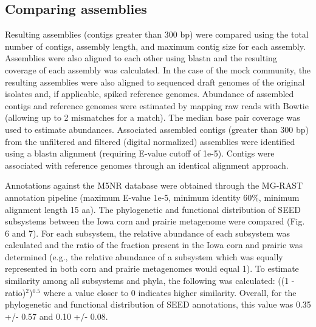 \documentclass[11pt]{article} %
\begin{document}
\subsection{Comparing assemblies}
Resulting assemblies (contigs greater than 300 bp) were compared using
the total number of contigs, assembly length, and maximum contig size
for each assembly.  Assemblies were also aligned to each other using
blastn and the resulting coverage of each assembly was calculated.  In
the case of the mock community, the resulting assemblies were also
aligned to sequenced draft genomes of the original isolates and, if
applicable, spiked reference genomes. Abundance of assembled contigs
and reference genomes were estimated by mapping raw reads with Bowtie
(allowing up to 2 mismatches for a match).  The median base pair
coverage was used to estimate abundances.  Associated assembled
contigs (greater than 300 bp) from the unfiltered and filtered
(digital normalized) assemblies were identified using a blastn
alignment (requiring E-value cutoff of 1e-5).  Contigs were associated
with reference genomes through an identical alignment approach.


Annotations against the M5NR database were obtained through the
MG-RAST annotation pipeline (maximum E-value 1e-5, minimum identity 60\%, minimum alignment length 15 aa). The phylogenetic and functional
distribution of SEED subsystems between the Iowa corn and prairie
metagenome were compared (Fig. 6 and 7).  For each subsystem, the
relative abundance of each subsystem was calculated and the ratio of
the fraction present in the Iowa corn and prairie was determined
(e.g., the relative abundance of a subsystem which was equally
represented in both corn and prairie metagenomes would equal 1).  To
estimate similarity among all subsystems and phyla, the following was
calculated: ((1 - ratio)$^2$)$^{0.5}$ where a value closer to 0
indicates higher similarity.  Overall, for the phylogenetic and
functional distribution of SEED annotations, this value was 0.35 +/-
0.57 and 0.10 +/- 0.08.

\end{document}
